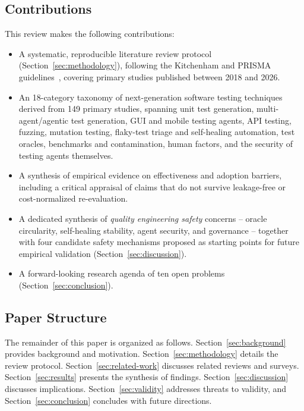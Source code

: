 \subsection{Contributions}
This review makes the following contributions:
\begin{itemize}
  \item A systematic, reproducible literature review protocol
        (Section~\ref{sec:methodology}), following the Kitchenham
        and PRISMA guidelines~\cite{kitchenham2007,page2021prisma},
        covering primary studies published between 2018 and 2026.
  \item An 18-category taxonomy of next-generation software testing
        techniques derived from 149 primary studies, spanning unit
        test generation, multi-agent/agentic test generation, GUI and
        mobile testing agents, API testing, fuzzing, mutation testing,
        flaky-test triage and self-healing automation, test oracles,
        benchmarks and contamination, human factors, and the security
        of testing agents themselves.
  \item A synthesis of empirical evidence on effectiveness and
        adoption barriers, including a critical appraisal of claims
        that do not survive leakage-free or cost-normalized
        re-evaluation.
  \item A dedicated synthesis of \emph{quality engineering safety}
        concerns -- oracle circularity, self-healing stability, agent
        security, and governance -- together with four candidate
        safety mechanisms proposed as starting points for future
        empirical validation (Section~\ref{sec:discussion}).
  \item A forward-looking research agenda of ten open problems
        (Section~\ref{sec:conclusion}).
\end{itemize}

\subsection{Paper Structure}
The remainder of this paper is organized as follows.
Section~\ref{sec:background} provides background and motivation.
Section~\ref{sec:methodology} details the review protocol.
Section~\ref{sec:related-work} discusses related reviews and surveys.
Section~\ref{sec:results} presents the synthesis of findings.
Section~\ref{sec:discussion} discusses implications.
Section~\ref{sec:validity} addresses threats to validity, and
Section~\ref{sec:conclusion} concludes with future directions.

